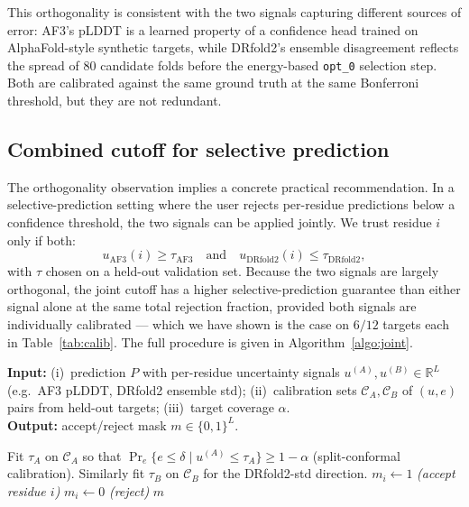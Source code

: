 \documentclass[conference,10pt]{IEEEtran}
\begin{document}
This orthogonality is consistent with the two signals capturing
different sources of error: AF3's pLDDT is a learned property of a
confidence head trained on AlphaFold-style synthetic targets, while
DRfold2's ensemble disagreement reflects the spread of $80$
candidate folds before the energy-based \texttt{opt\_0} selection
step. Both are calibrated against the same ground truth at the same
Bonferroni threshold, but they are not redundant.

\subsection{Combined cutoff for selective prediction}

The orthogonality observation implies a concrete practical
recommendation. In a selective-prediction setting where the user
rejects per-residue predictions below a confidence threshold, the
two signals can be applied jointly. We trust residue $i$ only if
both:
\begin{equation}
u_{\text{AF3}}(i) \geq \tau_{\text{AF3}} \quad \mathrm{and} \quad
u_{\text{DRfold2}}(i) \leq \tau_{\text{DRfold2}},
\end{equation}
with $\tau$ chosen on a held-out validation set. Because the two
signals are largely orthogonal, the joint cutoff has a higher
selective-prediction guarantee than either signal alone at the
same total rejection fraction, provided both signals are
individually calibrated --- which we have shown is the case on
$6/12$ targets each in Table~\ref{tab:calib}. The full procedure is
given in Algorithm~\ref{algo:joint}.

\begin{algorithm}[!t]
\caption{Combined-cutoff selective prediction across two
orthogonal per-residue uncertainty signals.}
\label{algo:joint}
\textbf{Input:} (i)~prediction $P$ with per-residue uncertainty
signals $u^{(A)}, u^{(B)} \in \mathbb{R}^L$ (e.g.\ AF3 pLDDT,
DRfold2 ensemble std); (ii)~calibration sets
$\mathcal{C}_A, \mathcal{C}_B$ of $(u, e)$ pairs from held-out
targets; (iii)~target coverage $\alpha$.\\
\textbf{Output:} accept/reject mask $m \in \{0, 1\}^L$.
\begin{algorithmic}[1]
  \STATE Fit $\tau_A$ on $\mathcal{C}_A$ so that
        $\Pr_{e}\{e \leq \delta \mid u^{(A)} \leq \tau_A\} \geq 1 - \alpha$
        (split-conformal calibration).
  \STATE Similarly fit $\tau_B$ on $\mathcal{C}_B$ for the
        DRfold2-std direction.
      \STATE $m_i \gets 1$ \quad \emph{(accept residue $i$)}
    \ELSE
      \STATE $m_i \gets 0$ \quad \emph{(reject)}
    \ENDIF
  \ENDFOR
  \RETURN $m$
\end{algorithmic}
\end{algorithm}
\end{document}
